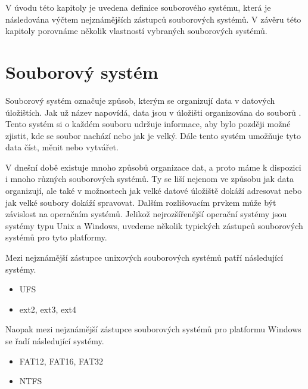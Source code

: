 V úvodu této kapitoly je uvedena definice souborového systému, která je následována výčtem nejznámějších zástupců souborových systémů. V závěru této kapitoly porovnáme několik vlastností vybraných souborových systémů.
\section{Souborový systém}
    \label{fs}
    Souborový systém označuje způsob, kterým se organizují data v datových úložištích. Jak už název napovídá, data jsou v úložišti organizována do souborů \cite{fs}.
    Tento systém si o každém souboru udržuje informace, aby bylo později možné zjistit, kde se soubor nachází nebo jak je velký. Dále tento systém umožňuje tyto data číst, měnit nebo vytvářet.

    V dnešní době existuje mnoho způsobů organizace dat, a proto máme k dispozici i mnoho různých souborových systémů. Ty se liší nejenom ve způsobu jak data organizují,
    ale také v možnostech jak velké datové úložiště dokáží adresovat nebo jak velké soubory dokáží spravovat. Dalším rozlišovacím prvkem může být závislost na operačním systémů.
    Jelikož nejrozšířenější operační systémy jsou systémy typu Unix a Windows, uvedeme několik typických zástupců souborových systémů pro tyto platformy.

    Mezi nejznámější zástupce unixových souborových systémů patří následující systémy.
    \begin{itemize}
      \item UFS
      \item ext2, ext3, ext4
    \end{itemize}

    Naopak mezi nejznámější zástupce souborových systémů pro platformu Windows se řadí následující systémy.
    \begin{itemize}
      \item FAT12, FAT16, FAT32
      \item NTFS
    \end{itemize}

